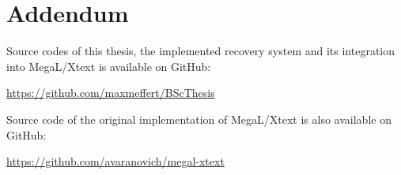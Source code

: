 \chapter*{Addendum}
Source codes of this thesis, the implemented recovery system and its integration into \gls{MegaL/Xtext} is available on GitHub:
\begin{center}
\url{https://github.com/maxmeffert/BScThesis}
\end{center}

\noindent
Source code of the original implementation of \gls{MegaL/Xtext} is also available on GitHub:
\begin{center}
\url{https://github.com/avaranovich/megal-xtext}
\end{center}